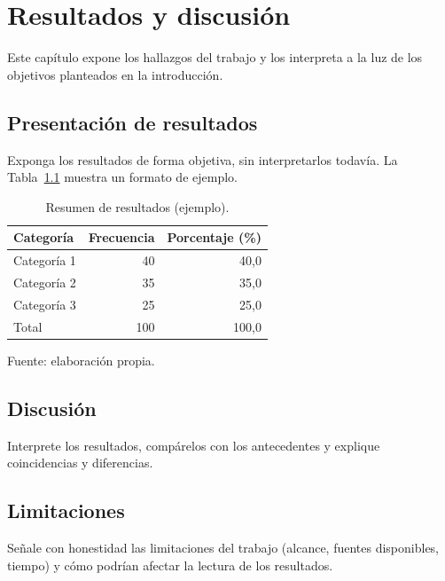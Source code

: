 \chapter{Resultados y discusión}
\label{cap:resultados}

Este capítulo expone los hallazgos del trabajo y los interpreta a la luz de los
objetivos planteados en la introducción.

\section{Presentación de resultados}
\label{sec:resultados}

Exponga los resultados de forma objetiva, sin interpretarlos todavía. La
Tabla~\ref{tab:resultados} muestra un formato de ejemplo.

\begin{table}[htbp]
  \centering
  \caption{Resumen de resultados (ejemplo).}
  \label{tab:resultados}
  \begin{tabular}{lrr}
    \toprule
    Categoría & Frecuencia & Porcentaje (\%) \\
    \midrule
    Categoría 1 & 40 & 40,0 \\
    Categoría 2 & 35 & 35,0 \\
    Categoría 3 & 25 & 25,0 \\
    \midrule
    Total       & 100 & 100,0 \\
    \bottomrule
  \end{tabular}
  \par\smallskip\footnotesize Fuente: elaboración propia.
\end{table}

\section{Discusión}
\label{sec:discusion}

Interprete los resultados, compárelos con los antecedentes y explique
coincidencias y diferencias.

\section{Limitaciones}
\label{sec:limitaciones}

Señale con honestidad las limitaciones del trabajo (alcance, fuentes
disponibles, tiempo) y cómo podrían afectar la lectura de los resultados.
